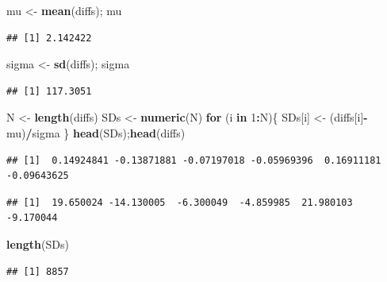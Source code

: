 \documentclass[]{article}
\newenvironment{Shaded}{\begin{snugshade}}{\end{snugshade}}
\newcommand{\ControlFlowTok}[1]{\textcolor[rgb]{0.13,0.29,0.53}{\textbf{#1}}}
\newcommand{\DecValTok}[1]{\textcolor[rgb]{0.00,0.00,0.81}{#1}}
\newcommand{\KeywordTok}[1]{\textcolor[rgb]{0.13,0.29,0.53}{\textbf{#1}}}
\newcommand{\NormalTok}[1]{#1}
\newcommand{\OperatorTok}[1]{\textcolor[rgb]{0.81,0.36,0.00}{\textbf{#1}}}
\newcommand{\StringTok}[1]{\textcolor[rgb]{0.31,0.60,0.02}{#1}}
\begin{document}
\begin{Shaded}
\begin{Highlighting}[]
\NormalTok{mu <-}\StringTok{ }\KeywordTok{mean}\NormalTok{(diffs); mu}
\end{Highlighting}
\end{Shaded}

\begin{verbatim}
## [1] 2.142422
\end{verbatim}

\begin{Shaded}
\begin{Highlighting}[]
\NormalTok{sigma <-}\StringTok{ }\KeywordTok{sd}\NormalTok{(diffs); sigma}
\end{Highlighting}
\end{Shaded}

\begin{verbatim}
## [1] 117.3051
\end{verbatim}

\begin{Shaded}
\begin{Highlighting}[]
\NormalTok{N <-}\StringTok{ }\KeywordTok{length}\NormalTok{(diffs)}
\NormalTok{SDs <-}\StringTok{ }\KeywordTok{numeric}\NormalTok{(N)}
\ControlFlowTok{for}\NormalTok{ (i }\ControlFlowTok{in} \DecValTok{1}\OperatorTok{:}\NormalTok{N)\{}
\NormalTok{  SDs[i] <-}\StringTok{ }\NormalTok{(diffs[i]}\OperatorTok{-}\NormalTok{mu)}\OperatorTok{/}\NormalTok{sigma}
\NormalTok{\}}
\KeywordTok{head}\NormalTok{(SDs);}\KeywordTok{head}\NormalTok{(diffs)}
\end{Highlighting}
\end{Shaded}

\begin{verbatim}
## [1]  0.14924841 -0.13871881 -0.07197018 -0.05969396  0.16911181 -0.09643625
\end{verbatim}

\begin{verbatim}
## [1]  19.650024 -14.130005  -6.300049  -4.859985  21.980103  -9.170044
\end{verbatim}

\begin{Shaded}
\begin{Highlighting}[]
\KeywordTok{length}\NormalTok{(SDs)}
\end{Highlighting}
\end{Shaded}

\begin{verbatim}
## [1] 8857
\end{verbatim}
\end{document}
